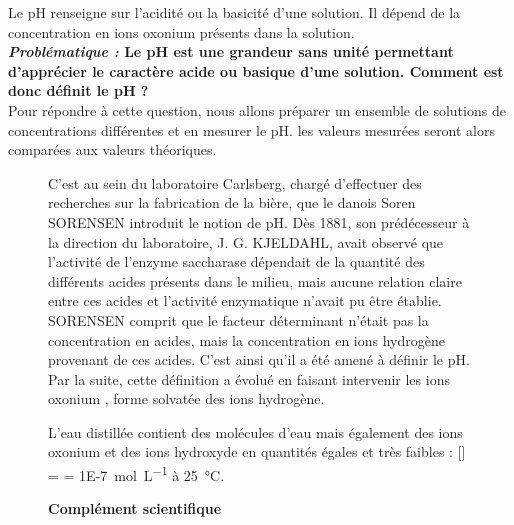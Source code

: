 \documentclass[a4paper,11pt,fleqn]{scrartcl}%
\begin{document}
\maketitle

Le pH renseigne sur l'acidité ou  la basicité d'une solution. Il dépend de la concentration en ions oxonium  présents dans la solution.\\
\textbf{\textit{Problématique :} Le pH est une grandeur sans unité permettant d'apprécier le caractère acide ou basique d'une solution. Comment est donc définit le pH ?}\\
Pour répondre à cette question, nous allons préparer un ensemble de solutions de concentrations différentes et en mesurer le pH. les valeurs mesurées seront alors comparées aux valeurs théoriques.

\begin{figure}[h!]
    		\begin{minipage}{.4\linewidth}
    		\caption{\textbf{La définition du pH}}
        C'est au sein du laboratoire Carlsberg, chargé d'effectuer des recherches sur la fabrication de la bière, que le danois Soren SORENSEN introduit le notion de pH. Dès 1881, son prédécesseur à la direction du laboratoire, J. G. KJELDAHL, avait observé que l'activité de l'enzyme saccharase dépendait de la quantité des différents acides présents dans le milieu, mais aucune relation claire entre ces acides et l'activité enzymatique n'avait pu être établie. SORENSEN comprit que le facteur déterminant n'était pas la concentration en acides, mais la concentration en ions hydrogène  provenant de ces acides. C'est ainsi qu'il a été amené à définir le pH. Par la suite, cette définition a évolué en faisant intervenir les ions oxonium , forme solvatée des ions hydrogène.
        \end{minipage}\hspace{1em}
        \begin{minipage}{.55\linewidth}
        \caption{\textbf{Complément scientifique}}
        L'eau distillée contient des molécules d'eau  mais également des ions oxonium  et des ions hydroxyde  en quantités égales et très faibles : 
        [] =  = \SI{1E-7}{\mole\per\liter} à \SI{25}{\celsius}.\\
        

\end{minipage}
\end{figure}
\end{document}
